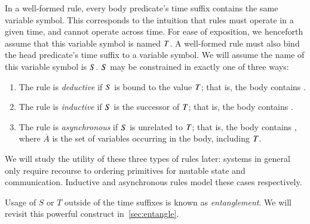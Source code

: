 
In a well-formed \lang rule, every body predicate's time suffix contains the
same variable symbol.  This corresponds to the intuition that rules must
operate in a given time, and cannot operate across time.  For ease of exposition, we henceforth assume that this
variable symbol is named $\DT$.  A well-formed \lang rule must also bind the
head predicate's time suffix to a variable symbol.  We will assume the name of
this variable symbol is $\DS$.  $\DS$ may be constrained in exactly one of
three ways:

\begin{enumerate}
%
\item The rule is {\em deductive} if $\DS$ is bound to the value
$\DT$; that is, the body contains \dedalus{$\DS$ = $\DT$}.
%
\item The rule is {\em inductive} if $\DS$ is the successor of
$\DT$; that is, the body contains .
%
\item The rule is {\em asynchronous} if $\DS$ is unrelated to $\DT$;
that is, the body contains , where $\overline{A}$ is the set of variables occurring in the body,
including $\DT$.
%
\end{enumerate}

We will study the utility of these three types of rules later: systems in
general only require recourse to ordering primitives for mutable state and communication.
Inductive and asynchronous rules model these cases respectively.

Usage of $S$ or $T$ outside of the time suffixes is known as {\em
entanglement}.  We will revisit this powerful construct in~\ref{sec:entangle}. 

